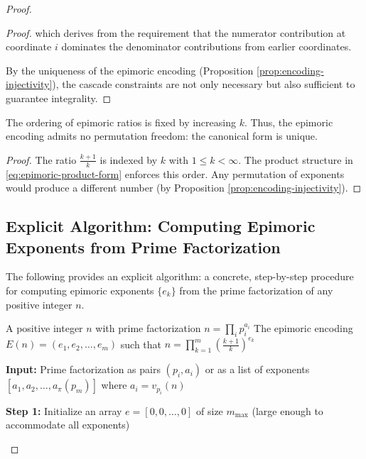 \begin{proof}
\begin{proof}
which derives from the requirement that the numerator contribution at coordinate $i$ dominates the denominator contributions from earlier coordinates.

By the uniqueness of the epimoric encoding (Proposition \ref{prop:encoding-injectivity}), the cascade constraints are not only necessary but also sufficient to guarantee integrality.

\end{proof}

\begin{proposition}
\label{prop:canonical-ordering}
The ordering of epimoric ratios is fixed by increasing $k$. Thus, the epimoric encoding admits no permutation freedom: the canonical form is unique.
\end{proposition}

\begin{proof}
The ratio $\frac{k+1}{k}$ is indexed by $k$ with $1 \leq k < \infty$. The product structure in \eqref{eq:epimoric-product-form} enforces this order. Any permutation of exponents would produce a different number (by Proposition \ref{prop:encoding-injectivity}).
\end{proof}

\subsection{Explicit Algorithm: Computing Epimoric Exponents from Prime Factorization}
\label{subsec:epimoric-algorithm}

The following provides an explicit algorithm: a concrete, step-by-step procedure for computing epimoric exponents $\{e_k\}$ from the prime factorization of any positive integer $n$.

\begin{algorithm}
\label{alg:epimoric-from-prime}
\caption{Epimoric Encoding Computation}
\begin{algorithmic}
\REQUIRE A positive integer $n$ with prime factorization $n = \prod_i p_i^{a_i}$
\ENSURE The epimoric encoding $E(n) = (e_1, e_2, \ldots, e_m)$ such that $n = \prod_{k=1}^m \left(\frac{k+1}{k}\right)^{e_k}$

\STATE \textbf{Input:} Prime factorization as pairs $(p_i, a_i)$ or as a list of exponents $[a_1, a_2, \ldots, a_\pi(p_m)]$ where $a_i = v_{p_i}(n)$

\STATE \textbf{Step 1:} Initialize an array $e = [0, 0, \ldots, 0]$ of size $m_{\max}$ (large enough to accommodate all exponents)


\end{algorithmic}
\end{algorithm}
\end{proof}
